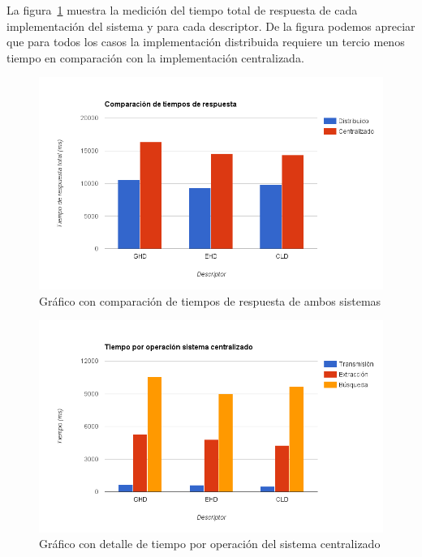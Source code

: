 La figura~\ref{resultados_tiempos_total} muestra la medición del tiempo total de respuesta de cada implementación del sistema y para cada descriptor. De la figura podemos apreciar que para todos los casos la implementación distribuida requiere un tercio menos tiempo en comparación con la implementación centralizada. 

	\begin{figure}[!h]
		\centering
		\includegraphics[width=\textwidth]{imagenes/cap5/resultados_tiempos_total.png}
		\caption{Gráfico con comparación de tiempos de respuesta de ambos sistemas}
		\label{resultados_tiempos_total}
	\end{figure}

	\begin{figure}[!h]
		\centering
		\includegraphics[width=\textwidth]{imagenes/cap5/resultados_tiempo_detalle_centralizado.png}
		\caption{Gráfico con detalle de tiempo por operación del sistema centralizado}
		\label{resultados_tiempo_detalle_centralizado}
	\end{figure}
	
